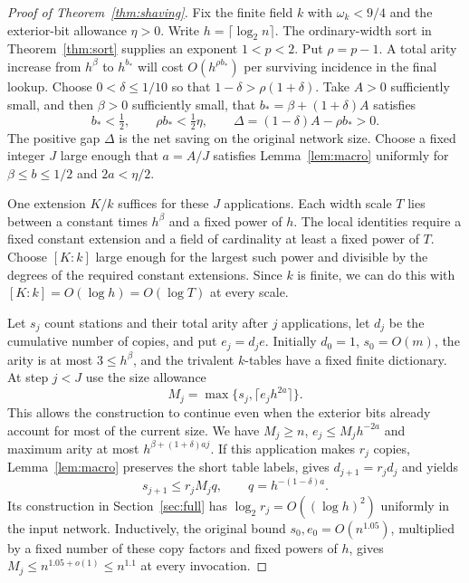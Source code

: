 \begin{proof}[Proof of Theorem~\ref{thm:shaving}]
Fix the finite field $k$ with $\omega_k<9/4$ and the exterior-bit
allowance $\eta>0$. Write $h=\lceil\log_2 n\rceil$. The ordinary-width
sort in Theorem~\ref{thm:sort} supplies an exponent $1<p<2$. Put
$\rho=p-1$. A total arity increase from $h^\beta$ to $h^{b_*}$ will
cost $O(h^{\rho b_*})$ per surviving incidence in the final lookup.
Choose $0<\delta\le1/10$ so that $1-\delta>\rho(1+\delta)$. Take
$A>0$ sufficiently small, and then $\beta>0$ sufficiently small, that
$b_*=\beta+(1+\delta)A$ satisfies
\begin{equation}\label{eq:shaving-margins}
 b_*<\tfrac12,\qquad \rho b_*<\tfrac12\eta,\qquad
 \Delta=(1-\delta)A-\rho b_*>0 .
\end{equation}
The positive gap $\Delta$ is the net saving on the original network
size. Choose a fixed integer $J$ large enough that $a=A/J$ satisfies
Lemma~\ref{lem:macro} uniformly for $\beta\le b\le1/2$ and
$2a<\eta/2$.

One extension $K/k$ suffices for these $J$ applications. Each width
scale $T$ lies between a constant times $h^\beta$ and a fixed power of
$h$. The local identities require a fixed constant extension and a
field of cardinality at least a fixed power of $T$. Choose $[K:k]$
large enough for the largest such power and divisible by the degrees
of the required constant extensions. Since $k$ is finite, we can do
this with $[K:k]=O(\log h)=O(\log T)$ at every scale.

Let $s_j$ count stations and their total arity after $j$ applications,
let $d_j$ be the cumulative number of copies, and put $e_j=d_j e$.
Initially $d_0=1$, $s_0=O(m)$, the arity is at most $3\le h^\beta$,
and the trivalent $k$-tables have a fixed finite dictionary. At step
$j<J$ use the size allowance
\[
 M_j=\max\{s_j,\lceil e_j h^{2a}\rceil\}.
\]
This allows the construction to continue even when the exterior bits
already account for most of the current size. We have $M_j\ge n$,
$e_j\le M_j h^{-2a}$ and maximum arity at most
$h^{\beta+(1+\delta)aj}$. If this application makes $r_j$ copies,
Lemma~\ref{lem:macro} preserves the short table labels, gives
$d_{j+1}=r_jd_j$ and yields
\[
 s_{j+1}\le r_j M_j q,\qquad q=h^{-(1-\delta)a}.
\]
Its construction in Section~\ref{sec:full} has
$\log_2 r_j=O((\log h)^2)$ uniformly in the input network. Inductively,
the original bound $s_0,e_0=O(n^{1.05})$, multiplied by a fixed
number of these copy factors and fixed powers of $h$, gives
$M_j\le n^{1.05+o(1)}\le n^{1.1}$ at every invocation.


\end{proof}
